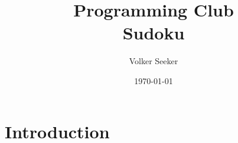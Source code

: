 \documentclass{article}
\title{
    \textbf{Programming Club}\\
    Sudoku \\
}
\author{Volker Seeker}
\date{\today}
\begin{document}
    \maketitle

\setlength{\parskip}{1em}
\setlength{\parindent}{0em}

    \section{Introduction}
\end{document}
